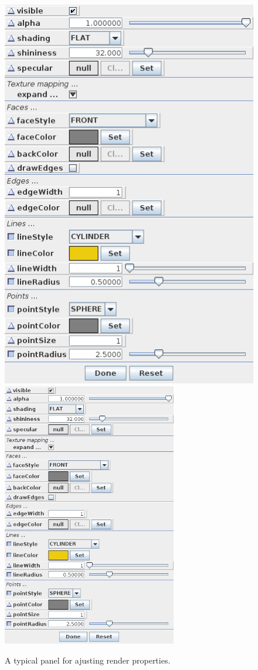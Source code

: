 \documentclass{article}
\begin{document}
\begin{figure}[h]
\begin{center}
\iflatexml
\includegraphics[]{images/renderProps}
\else
\includegraphics[width=3in]{images/renderProps}
\fi
\end{center}
\caption{A typical panel for ajusting render properties.}%
\label{renderpropsFig}
\end{figure}
\end{document}
